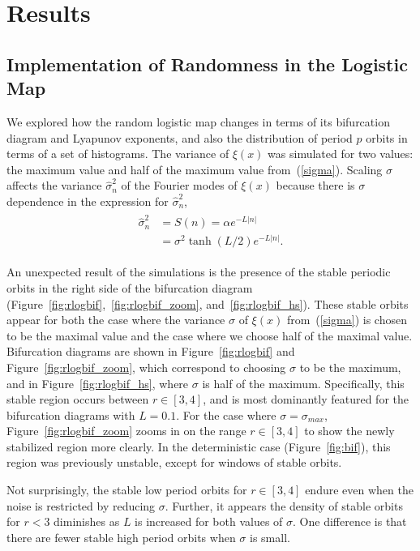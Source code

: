 \chapter{Results}
\section{Implementation of Randomness in the Logistic Map}
We explored how the random logistic map changes in terms of its
bifurcation diagram and Lyapunov exponents, and also the distribution
of period $p$ orbits in terms of a set of histograms. The variance of
$\xi(x)$ was simulated for two values: the maximum value and
half of the maximum value from~(\ref{sigma}). Scaling $\sigma$ affects
the variance $\hat{\sigma}_n^2$ of the Fourier modes of $\xi(x)$
because there is $\sigma$ dependence in the expression for $\hat{\sigma}_n^2$,
\begin{align*}
\begin{split}
\hat{\sigma}_n^2 &= S(n) = \alpha e^{-L|n|}\\
&= \sigma^2 \tanh(L/2) e^{-L|n|}.
\end{split}
\end{align*}

An unexpected result of the simulations is the presence of the stable
periodic orbits in the right side of the bifurcation diagram
(Figure~\ref{fig:rlogbif},~\ref{fig:rlogbif_zoom}, and~\ref{fig:rlogbif_hs}). These
stable orbits appear for both the case where the variance $\sigma$ of
$\xi(x)$ from~(\ref{sigma}) is chosen to be the maximal value and the
case where we choose half of the maximal
value. Bifurcation diagrams are shown in Figure~\ref{fig:rlogbif} and
Figure~\ref{fig:rlogbif_zoom}, which correspond to choosing $\sigma$
to be the maximum, and in Figure~\ref{fig:rlogbif_hs}, where $\sigma$ is half
of the maximum. Specifically, this stable region occurs between $r\in
[3,4]$, and is most dominantly featured for the bifurcation
diagrams with $L=0.1$. For the case where $\sigma=\sigma_{max}$, Figure~\ref{fig:rlogbif_zoom} zooms in on the
range $r \in [3,4]$ to show the newly stabilized region more clearly. In the
deterministic case (Figure~\ref{fig:bif}), this region was previously
unstable, except for windows of stable orbits. 

Not surprisingly, the stable low period
orbits for $r \in [3,4]$ endure even
when the noise is restricted by reducing $\sigma$. Further, it appears the density of
stable orbits for $r<3$ diminishes as $L$ is increased for both values
of $\sigma$. One difference is that there are fewer stable high period
orbits when $\sigma$ is small. 

